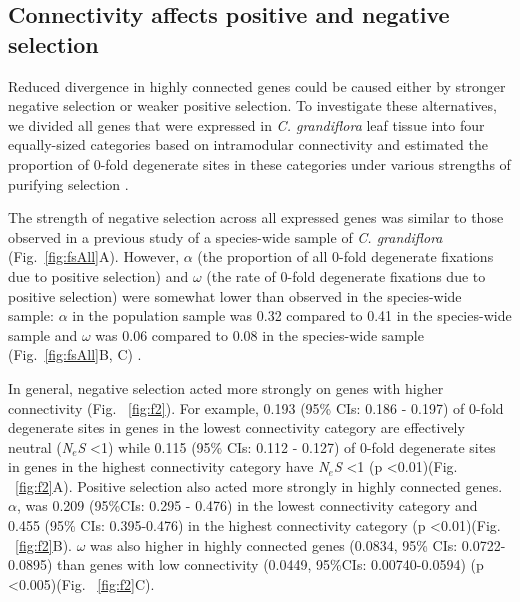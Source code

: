 \subsection{Connectivity affects positive and negative selection}
Reduced divergence in highly connected genes could be caused either by stronger negative selection or weaker positive selection. To investigate these alternatives, we divided all genes that were expressed in \textit{C. grandiflora} leaf tissue into four equally-sized categories based on intramodular connectivity and estimated the proportion of 0-fold degenerate sites in these categories under various strengths of purifying selection \citep{Eyre-Walker2009-zt}.

The strength of negative selection across all expressed genes was similar to those observed in a previous study of a species-wide sample of \textit{C. grandiflora} (Fig.~\ref{fig:fsAll}A). However, $\alpha$ (the proportion of all 0-fold degenerate fixations due to positive selection) and $\omega$ (the rate of 0-fold degenerate fixations due to positive selection) were somewhat lower than observed in the species-wide sample: $\alpha$ in the population sample was 0.32 compared to 0.41 in the species-wide sample and $\omega$ was 0.06 compared to 0.08 in the species-wide sample (Fig.~\ref{fig:fsAll}B, C) \citep{Williamson2014-tf}.

In general, negative selection acted more strongly on genes with higher connectivity (Fig. ~\ref{fig:f2}). For example, 0.193 (95\% CIs: 0.186 - 0.197) of 0-fold degenerate sites in genes in the lowest connectivity category are effectively neutral (\textit{N$_{e}$S} \textless 1) while 0.115 (95\% CIs: 0.112 - 0.127) of 0-fold degenerate sites in genes in the highest connectivity category have \textit{N$_{e}$S} \textless 1 (p \textless 0.01)(Fig. ~\ref{fig:f2}A). Positive selection also acted more strongly in highly connected genes. $\alpha$, was 0.209 (95\%CIs: 0.295 - 0.476) in the lowest connectivity category and 0.455 (95\% CIs: 0.395-0.476) in the highest connectivity category (p \textless 0.01)(Fig. ~\ref{fig:f2}B). $\omega$ was also higher in highly connected genes (0.0834, 95\% CIs: 0.0722-0.0895) than genes with low connectivity (0.0449, 95\%CIs: 0.00740-0.0594) (p \textless 0.005)(Fig. ~\ref{fig:f2}C).

